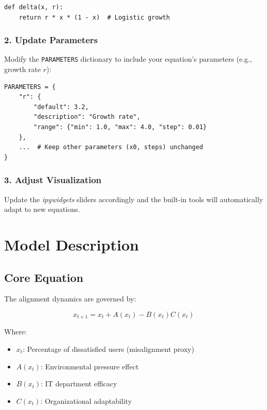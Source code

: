 \documentclass[a4paper, 10pt]{article}
\begin{document}
\begin{verbatim}
def delta(x, r):
    return r * x * (1 - x)  # Logistic growth
\end{verbatim}

\vspace{-1.5em}

\subsubsection*{2. Update Parameters}
Modify the \texttt{PARAMETERS} dictionary to include your equation's parameters (e.g., growth rate \(r\)):

\begin{verbatim}
PARAMETERS = {
    "r": {
        "default": 3.2,
        "description": "Growth rate",
        "range": {"min": 1.0, "max": 4.0, "step": 0.01}
    },
    ...  # Keep other parameters (x0, steps) unchanged
}
\end{verbatim}

\vspace{-1.5em}

\subsubsection*{3. Adjust Visualization}
Update the \textit{ipywidgets} sliders accordingly and the built-in tools will automatically adapt to new equations.

\clearpage
\section{Model Description}
\subsection{Core Equation}
The alignment dynamics are governed by:

\begin{equation}
	x_{t + 1} = x_t + A(x_t) - B(x_t)C(x_t)
\end{equation}

Where:
\begin{itemize}
	\item $x_t$: Percentage of dissatisfied users (misalignment proxy)
	\item $A(x_t)$: Environmental pressure effect
	\item $B(x_t)$: IT department efficacy
	\item $C(x_t)$: Organizational adaptability
\end{itemize}
\end{document}
